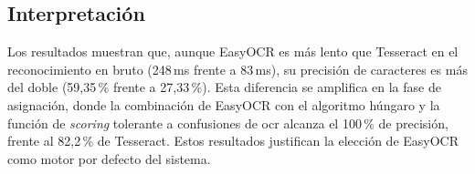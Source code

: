 \subsection{Interpretación}

Los resultados muestran que, aunque EasyOCR es más lento que Tesseract
en el reconocimiento en bruto (248\,ms frente a 83\,ms), su precisión
de caracteres es más del doble (59{,}35\,\% frente a 27{,}33\,\%). Esta
diferencia se amplifica en la fase de asignación, donde la combinación
de EasyOCR con el algoritmo húngaro y la función de \textit{scoring}
tolerante a confusiones de \acs{ocr} alcanza el 100\,\% de precisión,
frente al 82{,}2\,\% de Tesseract. Estos resultados justifican la
elección de EasyOCR como motor por defecto del sistema.
